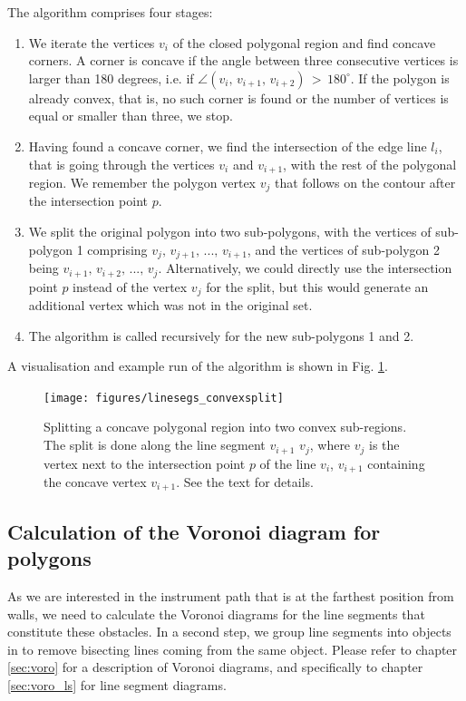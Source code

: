 The algorithm \cite{Hegazy2014} comprises four stages: 
\begin{enumerate}
	\item We iterate the vertices $v_i$ of the closed polygonal region and find concave corners.
		A corner is concave if the angle between three consecutive vertices is larger than 180 degrees,
		i.e. if $\angle\left(v_{i},\, v_{i+1},\, v_{i+2}\right) \, >\,  180^{\circ}$.
		If the polygon is already convex, that is, no such corner is found or the number of vertices is 
		equal or smaller than three, we stop.
	\item Having found a concave corner, we find the intersection of the edge line $l_i$, that is going 
		through the vertices $v_{i}$ and $v_{i+1}$, with the rest of the polygonal region.
		We remember the polygon vertex $v_j$ that follows on the contour after the intersection point $p$.
	\item We split the original polygon into two sub-polygons, with the vertices of sub-polygon 1 comprising
		$v_j,\, v_{j+1},\, ...,\, v_{i+1} $, and the vertices of sub-polygon 2 being $v_{i+1},\, v_{i+2},\, ...,\, v_j$.
		Alternatively, we could directly use the intersection point $p$ instead of the vertex $v_j$ for
		the split, but this would generate an additional vertex which was not in the original set.
	\item The algorithm is called recursively for the new sub-polygons 1 and 2.
\end{enumerate}
A visualisation and example run of the algorithm is shown in Fig. \ref{fig:contour_splitting}.


\begin{figure}[htb]
	\centering
	\texttt{[image: figures/linesegs\_convexsplit]}
	\caption[Splitting of concave regions.]{
		Splitting a concave polygonal region into two convex sub-regions. The split is done 
		along the line segment $v_{i+1}$ $v_{j}$, where $v_j$ is the vertex next to the intersection
		point $p$ of the line $v_i$, $v_{i+1}$ containing the concave vertex $v_{i+1}$. See the text
		for details.
		\label{fig:contour_splitting}}
\end{figure}



\subsection{Calculation of the Voronoi diagram for polygons}
\label{sec:polygonal_voronoi_diagram}
As we are interested in the instrument path that is at the farthest position 
from walls, we need to calculate the Voronoi diagrams for the line segments 
that constitute these obstacles. 
In a second step, we group line segments into objects in to remove bisecting lines 
coming from the same object.
Please refer to chapter \ref{sec:voro} for a description of Voronoi diagrams, and
specifically to chapter \ref{sec:voro_ls} for line segment diagrams.

